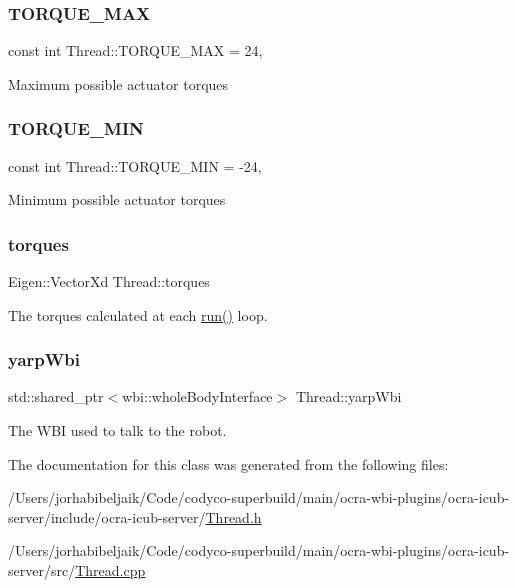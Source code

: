 \subsubsection{\texorpdfstring{T\+O\+R\+Q\+U\+E\+\_\+\+M\+AX}{TORQUE\_MAX}}
{\footnotesize\ttfamily const int Thread\+::\+T\+O\+R\+Q\+U\+E\+\_\+\+M\+AX = 24\hspace{0.3cm}{\ttfamily [static]}, {\ttfamily [private]}}

Maximum possible actuator torques \hypertarget{classThread_ad44e5fbda8070c252ea71823a4b9a6db}{}\label{classThread_ad44e5fbda8070c252ea71823a4b9a6db} 
\subsubsection{\texorpdfstring{T\+O\+R\+Q\+U\+E\+\_\+\+M\+IN}{TORQUE\_MIN}}
{\footnotesize\ttfamily const int Thread\+::\+T\+O\+R\+Q\+U\+E\+\_\+\+M\+IN = -\/24\hspace{0.3cm}{\ttfamily [static]}, {\ttfamily [private]}}

Minimum possible actuator torques \hypertarget{classThread_a3238993799b36af06f3858a3f65dcf1e}{}\label{classThread_a3238993799b36af06f3858a3f65dcf1e} 
\subsubsection{\texorpdfstring{torques}{torques}}
{\footnotesize\ttfamily Eigen\+::\+Vector\+Xd Thread\+::torques\hspace{0.3cm}{\ttfamily [private]}}

The torques calculated at each \hyperlink{classThread_ad9373d8d725c46717dfce3130018fe3a}{run()} loop. \hypertarget{classThread_aa3f4bbc2dca15c247a13de1bdbc4f7a3}{}\label{classThread_aa3f4bbc2dca15c247a13de1bdbc4f7a3} 
\subsubsection{\texorpdfstring{yarp\+Wbi}{yarpWbi}}
{\footnotesize\ttfamily std\+::shared\+\_\+ptr$<$wbi\+::whole\+Body\+Interface$>$ Thread\+::yarp\+Wbi\hspace{0.3cm}{\ttfamily [private]}}

The W\+BI used to talk to the robot. 

The documentation for this class was generated from the following files\+:\begin{DoxyCompactItemize}
\item 
/\+Users/jorhabibeljaik/\+Code/codyco-\/superbuild/main/ocra-\/wbi-\/plugins/ocra-\/icub-\/server/include/ocra-\/icub-\/server/\hyperlink{Thread_8h}{Thread.\+h}\item 
/\+Users/jorhabibeljaik/\+Code/codyco-\/superbuild/main/ocra-\/wbi-\/plugins/ocra-\/icub-\/server/src/\hyperlink{Thread_8cpp}{Thread.\+cpp}\end{DoxyCompactItemize}
